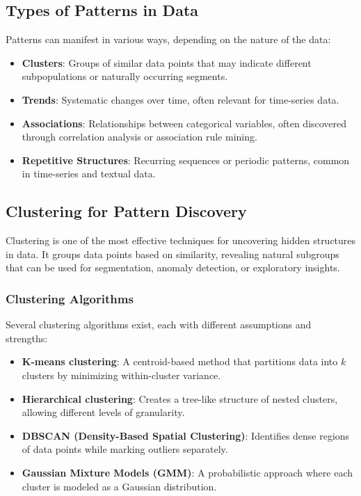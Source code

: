 \documentclass[12pt,openany]{book}
\begin{document}
\subsection{Types of Patterns in Data}

Patterns can manifest in various ways, depending on the nature of the data:
\begin{itemize}
    \item \textbf{Clusters}: Groups of similar data points that may indicate different subpopulations or naturally occurring segments.
    \item \textbf{Trends}: Systematic changes over time, often relevant for time-series data.
    \item \textbf{Associations}: Relationships between categorical variables, often discovered through correlation analysis or association rule mining.
    \item \textbf{Repetitive Structures}: Recurring sequences or periodic patterns, common in time-series and textual data.
\end{itemize}


\subsection{Clustering for Pattern Discovery}

Clustering is one of the most effective techniques for uncovering hidden structures in data. It groups data points based on similarity, revealing natural subgroups that can be used for segmentation, anomaly detection, or exploratory insights.

\subsubsection{Clustering Algorithms}

Several clustering algorithms exist, each with different assumptions and strengths:
\begin{itemize}
    \item \textbf{K-means clustering}: A centroid-based method that partitions data into \( k \) clusters by minimizing within-cluster variance.
    \item \textbf{Hierarchical clustering}: Creates a tree-like structure of nested clusters, allowing different levels of granularity.
    \item \textbf{DBSCAN (Density-Based Spatial Clustering)}: Identifies dense regions of data points while marking outliers separately.
    \item \textbf{Gaussian Mixture Models (GMM)}: A probabilistic approach where each cluster is modeled as a Gaussian distribution.
\end{itemize}
\end{document}
